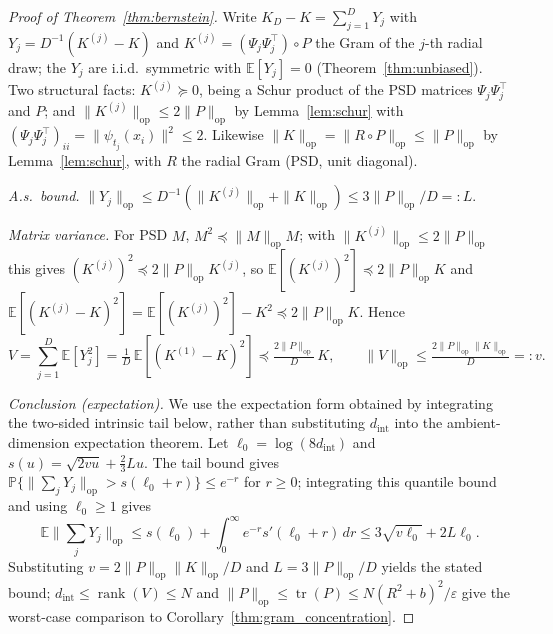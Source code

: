 \documentclass{article}
\begin{document}
\begin{proof}[Proof of Theorem~\ref{thm:bernstein}]
Write $K_D-K=\sum_{j=1}^D Y_j$ with $Y_j=D^{-1}(K^{(j)}-K)$ and $K^{(j)}=(\Psi_j\Psi_j^\top)\circ P$ the Gram of the $j$-th radial draw; the $Y_j$ are i.i.d.\ symmetric with $\mathbb{E}[Y_j]=0$ (Theorem~\ref{thm:unbiased}). Two structural facts: $K^{(j)}\succeq0$, being a Schur product of the PSD matrices $\Psi_j\Psi_j^\top$ and $P$; and $\|K^{(j)}\|_{\mathrm{op}}\le2\|P\|_{\mathrm{op}}$ by Lemma~\ref{lem:schur} with $(\Psi_j\Psi_j^\top)_{ii}=\|\psi_{t_j}(x_i)\|^2\le2$. Likewise $\|K\|_{\mathrm{op}}=\|R\circ P\|_{\mathrm{op}}\le\|P\|_{\mathrm{op}}$ by Lemma~\ref{lem:schur}, with $R$ the radial Gram (PSD, unit diagonal).

\emph{A.s.\ bound.} $\|Y_j\|_{\mathrm{op}}\le D^{-1}(\|K^{(j)}\|_{\mathrm{op}}+\|K\|_{\mathrm{op}})\le 3\|P\|_{\mathrm{op}}/D=:L$.

\emph{Matrix variance.} For PSD $M$, $M^2\preceq\|M\|_{\mathrm{op}}M$; with $\|K^{(j)}\|_{\mathrm{op}}\le2\|P\|_{\mathrm{op}}$ this gives $(K^{(j)})^2\preceq2\|P\|_{\mathrm{op}}K^{(j)}$, so $\mathbb{E}[(K^{(j)})^2]\preceq2\|P\|_{\mathrm{op}}K$ and $\mathbb{E}[(K^{(j)}-K)^2]=\mathbb{E}[(K^{(j)})^2]-K^2\preceq2\|P\|_{\mathrm{op}}K$. Hence
\[
V=\sum_{j=1}^D\mathbb{E}[Y_j^2]=\tfrac1D\,\mathbb{E}[(K^{(1)}-K)^2]\preceq\tfrac{2\|P\|_{\mathrm{op}}}{D}\,K,\qquad \|V\|_{\mathrm{op}}\le\tfrac{2\|P\|_{\mathrm{op}}\|K\|_{\mathrm{op}}}{D}=:v.
\]

\emph{Conclusion (expectation).} We use the expectation form obtained by integrating the two-sided intrinsic tail below, rather than substituting $d_{\mathrm{int}}$ into the ambient-dimension expectation theorem. Let $\ell_0=\log(8d_{\mathrm{int}})$ and $s(u)=\sqrt{2vu}+\tfrac23Lu$. The tail bound gives $\mathbb{P}\{\|\sum_jY_j\|_{\mathrm{op}}>s(\ell_0+r)\}\le e^{-r}$ for $r\ge0$; integrating this quantile bound and using $\ell_0\ge1$ gives
\[
\mathbb{E}\|\textstyle\sum_jY_j\|_{\mathrm{op}}\le s(\ell_0)+\int_0^\infty e^{-r}s'(\ell_0+r)\,dr
\le 3\sqrt{v\ell_0}+2L\ell_0.
\]
Substituting $v=2\|P\|_{\mathrm{op}}\|K\|_{\mathrm{op}}/D$ and $L=3\|P\|_{\mathrm{op}}/D$ yields the stated bound; $d_{\mathrm{int}}\le\operatorname{rank}(V)\le N$ and $\|P\|_{\mathrm{op}}\le\operatorname{tr}(P)\le N(R^2+b)^2/\varepsilon$ give the worst-case comparison to Corollary~\ref{thm:gram_concentration}.


\end{proof}
\end{document}
